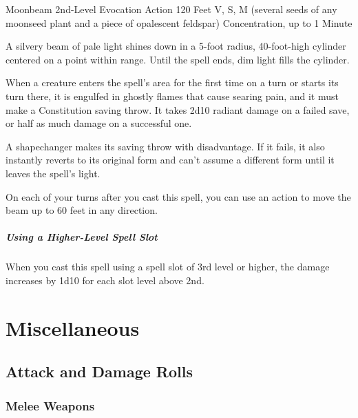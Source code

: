 \documentclass[letterpaper,openany,oneside,twocolumn]{book}
\begin{document}
\DndSpellHeader
  {Moonbeam}
  {2nd-Level Evocation}
  {Action}
  {120 Feet}
  {V, S, M (several seeds of any moonseed plant and a piece of opalescent feldspar)}
  {Concentration, up to 1 Minute}

A silvery beam of pale light shines down in a 5-foot radius, 40-foot-high cylinder centered on a point within range. Until the spell ends, dim light fills the cylinder.

When a creature enters the spell's area for the first time on a turn or starts its turn there, it is engulfed in ghostly flames that cause searing pain, and it must make a Constitution saving throw. It takes 2d10 radiant damage on a failed save, or half as much damage on a successful one.

A shapechanger makes its saving throw with disadvantage. If it fails, it also instantly reverts to its original form and can't assume a different form until it leaves the spell's light.

On each of your turns after you cast this spell, you can use an action to move the beam up to 60 feet in any direction.

\subparagraph*{Using a Higher-Level Spell Slot} When you cast this spell using a spell slot of 3rd level or higher, the damage increases by 1d10 for each slot level above 2nd.

\vfill\eject
\section*{Miscellaneous}
\subsection*{Attack and Damage Rolls}
\subsubsection*{Melee Weapons}
\end{document}
